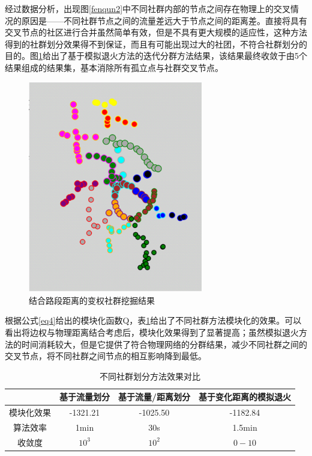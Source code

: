 		经过数据分析，出现图\ref{fenqun2}中不同社群内部的节点之间存在物理上的交叉情况的原因是——不同社群节点之间的流量差远大于节点之间的距离差。直接将具有交叉节点的社区进行合并虽然简单有效，但是不具有更大规模的适应性，这种方法得到的社群划分效果得不到保证，而且有可能出现过大的社团，不符合社群划分的目的。图\ref{fenqun3}给出了基于模拟退火方法的迭代分群方法结果，该结果最终收敛于由5个结果组成的结果集，基本消除所有孤立点与社群交叉节点。


				\begin{figure}
				\centering
				\includegraphics[width=3in]{picture/fenqunjieguo}
				\caption{结合路段距离的变权社群挖掘结果}
				\label{fenqun3}
				\end{figure}

		根据公式\ref{eq4}给出的模块化函数Q，表\ref{table10}给出了不同社群方法模块化的效果。可以看出将边权与物理距离结合考虑后，模块化效果得到了显著提高；虽然模拟退火方法的时间消耗较大，但是它提供了符合物理网络的分群结果，减少不同社群之间的交叉节点，将不同社群之间节点的相互影响降到最低。

				\begin{table}[h]
				\centering
				\begin{tabular}{|c|c|c|c|}
				\hline
				\hline
				   &   基于流量划分 &   基于流量/距离划分 &   基于变化距离的模拟退火  \\
				\hline
				  模块化效果 &   -1321.21 &   -1025.50 &   -1182.84  \\
				\hline
				  算法效率 &   1min &  30s   &   1.5min  \\
				\hline
				  收敛度 &   $10^3$ &   $10^2$ &   $0-10$  \\
				\hline
				\end{tabular}
				\caption{不同社群划分方法效果对比}
				\label{table10}
				\end{table} 



